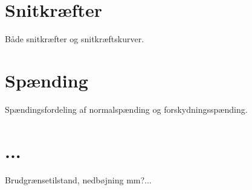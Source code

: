 \section{Snitkræfter}
Både snitkræfter og snitkræftskurver.

\section{Spænding}
Spændingsfordeling af normalspænding og forskydningsspænding.

\section{...}
Brudgrænsetilstand, nedbøjning mm?...